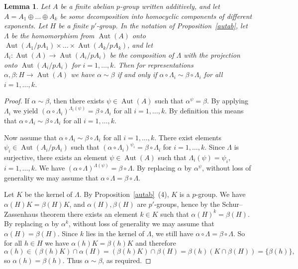 \documentclass{article}
\newtheorem{lemma}[theorem]{Lemma}
\DeclareMathOperator{\Aut}{Aut}
\begin{document}
\begin{lemma}\label{elabred}
	Let \( A \) be a finite abelian \( p \)-group written additively, and let \( A = A_1 \oplus \dots \oplus A_k \)
	be some decomposition into homocyclic components of different exponents.
	Let \( H \) be a finite \( p' \)-group.
	In the notation of Proposition~\ref{autab}, let \( \Lambda \) be the homomorphism from \( \Aut(A) \)
	onto \( \Aut(A_1 / pA_1) \times \dots \times \Aut(A_k / pA_k) \), and let \( \Lambda_i : \Aut(A) \to \Aut(A_i/pA_i) \)
	be the composition of \( \Lambda \) with the projection onto \( \Aut(A_i/pA_i) \) for \( i = 1, \dots, k \).
	Then for representations \( \alpha, \beta : H \to \Aut(A) \) we have \( \alpha \sim \beta \) if and only if
	\( \alpha \circ \Lambda_i \sim \beta \circ \Lambda_i \) for all \( i = 1, \dots, k \).
\end{lemma}
\begin{proof}
	If \( \alpha \sim \beta \), then there exists \( \psi \in \Aut(A) \) such that \( \alpha^\psi = \beta \).
	By applying \( \Lambda_i \) we yield \( (\alpha \circ \Lambda_i)^{\Lambda_i(\psi)} = \beta \circ \Lambda_i \)
	for all \( i = 1, \dots, k \). By definition this means that \( \alpha \circ \Lambda_i \sim \beta \circ \Lambda_i \) for all \( i = 1, \dots, k \).

	Now assume that \( \alpha \circ \Lambda_i \sim \beta \circ \Lambda_i \) for all \( i = 1, \dots, k \).
	There exist elements \( \psi_i \in \Aut(A_i/pA_i) \) such that \( (\alpha \circ \Lambda_i)^{\psi_i} = \beta \circ \Lambda_i \)
	for \( i = 1, \dots, k \). Since \( \Lambda \) is surjective, there exists an element \( \psi \in \Aut(A) \)
	such that \( \Lambda_i(\psi) = \psi_i \), \( i = 1, \dots, k \). We have \( (\alpha \circ \Lambda)^{\Lambda(\psi)} = \beta \circ \Lambda \).
	By replacing \( \alpha \) by \( \alpha^\psi \), without loss of generality we may assume that \( \alpha \circ \Lambda = \beta \circ \Lambda \).

	Let \( K \) be the kernel of \( \Lambda \).
	By Proposition~\ref{autab}~(4), \( K \) is a \( p \)-group. We have \( \alpha(H)K = \beta(H)K \), and \( \alpha(H), \beta(H) \) are \( p' \)-groups,
	hence by the Schur--Zassenhaus theorem there exists an element \( k \in K \) such that \( \alpha(H)^k = \beta(H) \). By replacing \( \alpha \) by \( \alpha^k \),
	without loss of generality we may assume that \( \alpha(H) = \beta(H) \). Since \( k \) lies in the kernel of \( \Lambda \),
	we still have \( \alpha \circ \Lambda = \beta \circ \Lambda \). So for all \( h \in H \) we have \( \alpha(h)K = \beta(h)K \) and therefore
	\[ \alpha(h) \in (\beta(h)K) \cap \alpha(H) = (\beta(h)K) \cap \beta(H) = \beta(h)(K \cap \beta(H)) = \{ \beta(h) \}, \]
	so \( \alpha(h) = \beta(h) \). Thus \( \alpha \sim \beta \), as required.
\end{proof}
\end{document}
